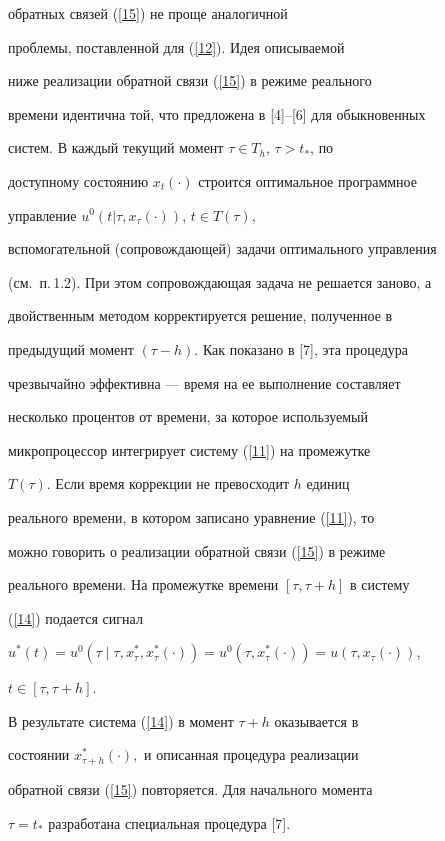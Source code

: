 обратных связей (\ref{15}) не проще аналогичной


проблемы, поставленной для (\ref{12}). Идея описываемой


ниже реализации обратной связи (\ref{15}) в режиме реального


времени идентична той, что предложена в [4]--[6] для обыкновенных


систем. В каждый текущий момент $\tau \in T_h$, $\tau > t_*$, по


доступному состоянию $x_t(\cdot)$ строится оптимальное программное


управление $u^0(t|\tau,x_{\tau}(\cdot))$, $t \in T(\tau)$,


вспомогательной (сопровождающей) задачи оптимального управления


(см.~п.\,1.2). При этом сопровождающая задача не решается заново, а


двойственным методом корректируется решение, полученное в


предыдущий момент $(\tau-h)$. Как показано в [7], эта процедура


чрезвычайно эффективна --- время на ее выполнение составляет


несколько процентов от времени, за которое используемый


микропроцессор интегрирует систему (\ref{11}) на промежутке


$T(\tau).$ Если время коррекции не превосходит $h$ единиц


реального времени, в котором записано уравнение (\ref{11}), то


можно говорить о реализации обратной связи (\ref{15}) в режиме


реального времени. На промежутке времени $[\tau,\tau+h]$ \tts{[} в систему


(\ref{14}) подается сигнал


$u^{*}(t)=u^0(\tau\mid\tau,x^*_\tau,x^*_\tau(\cdot))=


u^0(\tau,x^*_\tau(\cdot))=u(\tau,x_\tau(\cdot))$,


$t \in [\tau, \tau+h]$. \tts{[}


В результате система (\ref{14}) в момент $\tau+h$ оказывается в


состоянии $x^*_{\tau+h}(\cdot),$ и описанная процедура реализации


обратной связи (\ref{15}) повторяется. Для начального момента


$\tau=t_*$ разработана специальная процедура [7].





